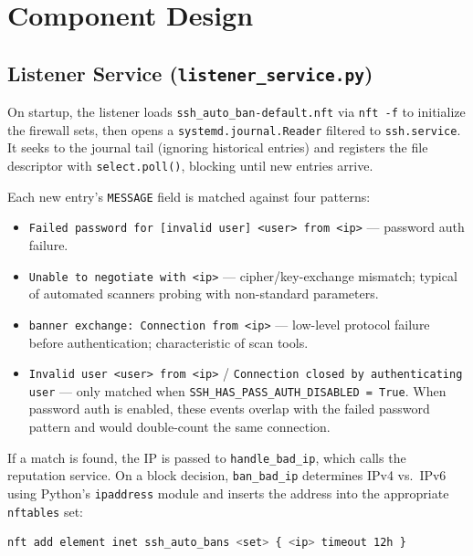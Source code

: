 \documentclass[11pt, letterpaper]{article}
\begin{document}
\section{Component Design}

\subsection{Listener Service (\texttt{listener\_service.py})}

On startup, the listener loads \texttt{ssh\_auto\_ban-default.nft} via \texttt{nft -f} to initialize the firewall sets, then opens a \texttt{systemd.journal.Reader} filtered to \texttt{ssh.service}. It seeks to the journal tail (ignoring historical entries) and registers the file descriptor with \texttt{select.poll()}, blocking until new entries arrive.

Each new entry's \texttt{MESSAGE} field is matched against four patterns:

\begin{itemize}[leftmargin=1.5em, itemsep=2pt]
    \item \texttt{Failed password for [invalid user] <user> from <ip>} --- password auth failure.
    \item \texttt{Unable to negotiate with <ip>} --- cipher/key-exchange mismatch; typical of automated scanners probing with non-standard parameters.
    \item \texttt{banner exchange: Connection from <ip>} --- low-level protocol failure before authentication; characteristic of scan tools.
    \item \texttt{Invalid user <user> from <ip>} / \texttt{Connection closed by authenticating user} --- only matched when \texttt{SSH\_HAS\_PASS\_AUTH\_DISABLED = True}. When password auth is enabled, these events overlap with the failed password pattern and would double-count the same connection.
\end{itemize}

If a match is found, the IP is passed to \texttt{handle\_bad\_ip}, which calls the reputation service. On a block decision, \texttt{ban\_bad\_ip} determines IPv4 vs.\ IPv6 using Python's \texttt{ipaddress} module and inserts the address into the appropriate \texttt{nftables} set:
\vspace{6pt}
\begin{lstlisting}[language=bash]
nft add element inet ssh_auto_bans <set> { <ip> timeout 12h }
\end{lstlisting}
\end{document}
